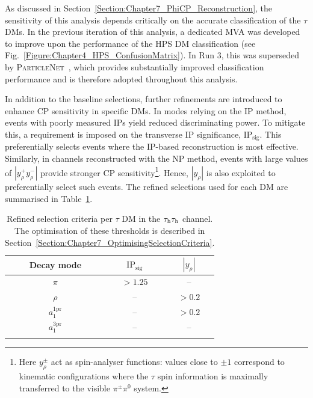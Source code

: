 As discussed in Section~\ref{Section:Chapter7_PhiCP_Reconstruction}, the sensitivity of this analysis depends critically on the accurate classification of the $\tau$ \acp{DM}. In the previous iteration of this analysis, a dedicated \ac{MVA} was developed to improve upon the performance of the \ac{HPS} \ac{DM} classification (see Fig.~\ref{Figure:Chapter4_HPS_ConfusionMatrix}). In Run 3, this was superseded by \textsc{ParticleNet}~\cite{Qu:2019gqs}, which provides substantially improved classification performance and is therefore adopted throughout this analysis.  

In addition to the baseline selections, further refinements are introduced to enhance CP sensitivity in specific \acp{DM}. In modes relying on the \ac{IP} method, events with poorly measured \acp{IP} yield reduced discriminating power. To mitigate this, a requirement is imposed on the transverse \ac{IP} significance, IP$_\text{sig}$. This preferentially selects events where the \ac{IP}-based reconstruction is most effective. Similarly, in channels reconstructed with the \ac{NP} method, events with large values of $|y_\rho^+ y_\rho^-|$ provide stronger CP sensitivity\footnote{Here $y_\rho^\pm$ act as spin-analyser functions: values close to $\pm 1$ correspond to kinematic configurations where the $\tau$ spin information is maximally transferred to the visible $\pi^\pm\pi^0$ system.}. Hence, $|y_\rho|$ is also exploited to preferentially select such events. The refined selections used for each \ac{DM} are summarised in Table~\ref{Table:Chapter7_RefinedSelections_perDM}.  

\begin{table}[!htbp]
\centering
\renewcommand{\arraystretch}{1.5}
\setlength{\tabcolsep}{12pt}

\begin{tabular}{ccc}
\hline
Decay mode & $\text{IP}_\text{sig}$ & $|y_\rho|$ \\
\hline
$\pi$ &  $> 1.25$ & -- \\
\arrayrulecolor{lightgray} \hline
$\rho$ &  -- & $> 0.2$ \\
\arrayrulecolor{lightgray} \hline
$a_1^\text{1pr}$ &  -- & $> 0.2$ \\
\arrayrulecolor{lightgray} \hline
$a_1^\text{3pr}$ &  -- & -- \\
\arrayrulecolor{black} \hline
\end{tabular}
\caption[Refined selection criteria per $\tau$ decay mode in the $\tauh\tauh$ channel.]{
Refined selection criteria per $\tau$ \ac{DM} in the $\tauh\tauh$ channel. The optimisation of these thresholds is described in Section~\ref{Section:Chapter7_OptimisingSelectionCriteria}.}
\label{Table:Chapter7_RefinedSelections_perDM}
\end{table}

